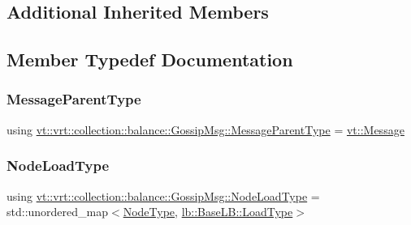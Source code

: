 \subsection*{Additional Inherited Members}


\subsection{Member Typedef Documentation}
\mbox{\label{structvt_1_1vrt_1_1collection_1_1balance_1_1_gossip_msg_a640e492438ba6fd6c8affa25ed0f17fc}} 
\subsubsection{\texorpdfstring{Message\+Parent\+Type}{MessageParentType}}
{\footnotesize\ttfamily using \hyperlink{structvt_1_1vrt_1_1collection_1_1balance_1_1_gossip_msg_a640e492438ba6fd6c8affa25ed0f17fc}{vt\+::vrt\+::collection\+::balance\+::\+Gossip\+Msg\+::\+Message\+Parent\+Type} =  \hyperlink{namespacevt_a3a3ddfef40b4c90915fa43cdd5f129ea}{vt\+::\+Message}}

\mbox{\label{structvt_1_1vrt_1_1collection_1_1balance_1_1_gossip_msg_a8deef056cb137cfd67540a31be189122}} 
\subsubsection{\texorpdfstring{Node\+Load\+Type}{NodeLoadType}}
{\footnotesize\ttfamily using \hyperlink{structvt_1_1vrt_1_1collection_1_1balance_1_1_gossip_msg_a8deef056cb137cfd67540a31be189122}{vt\+::vrt\+::collection\+::balance\+::\+Gossip\+Msg\+::\+Node\+Load\+Type} =  std\+::unordered\+\_\+map$<$\hyperlink{namespacevt_a866da9d0efc19c0a1ce79e9e492f47e2}{Node\+Type}, \hyperlink{structvt_1_1vrt_1_1collection_1_1lb_1_1_base_l_b_a215e22b9f12678303f49615ae3be05cc}{lb\+::\+Base\+L\+B\+::\+Load\+Type}$>$}



